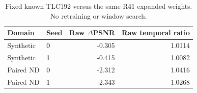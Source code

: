 \begin{table}[t]
\centering\small
\caption{Fixed known TLC192 versus the same R41 expanded weights. No retraining or window search.}
\label{tab:tlc}
\begin{tabular}{llrr}
\toprule
Domain & Seed & Raw $\Delta$PSNR & Raw temporal ratio\\
\midrule
Synthetic & 0 & -0.305 & 1.0114\\
Synthetic & 1 & -0.415 & 1.0082\\
Paired ND & 0 & -2.312 & 1.0416\\
Paired ND & 1 & -2.343 & 1.0268\\
\bottomrule
\end{tabular}
\end{table}
